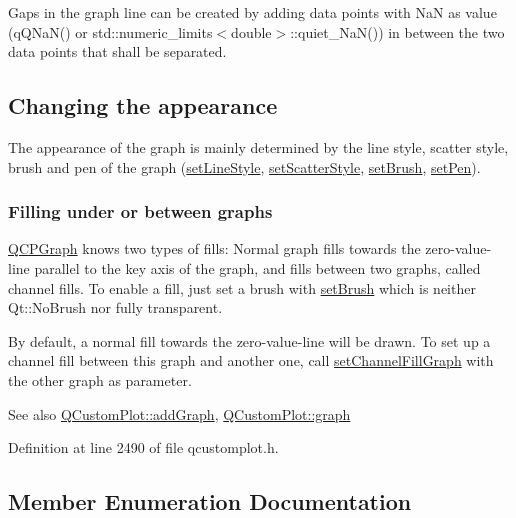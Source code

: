 Gaps in the graph line can be created by adding data points with Na\+N as value ({\ttfamily q\+Q\+Na\+N()} or {\ttfamily std\+::numeric\+\_\+limits$<$double$>$\+::quiet\+\_\+\+Na\+N()}) in between the two data points that shall be separated.\hypertarget{class_q_c_p_statistical_box_appearance}{}\subsection{Changing the appearance}\label{class_q_c_p_statistical_box_appearance}
The appearance of the graph is mainly determined by the line style, scatter style, brush and pen of the graph (\hyperlink{class_q_c_p_graph_a513fecccff5b2a50ce53f665338c60ff}{set\+Line\+Style}, \hyperlink{class_q_c_p_graph_a12bd17a8ba21983163ec5d8f42a9fea5}{set\+Scatter\+Style}, \hyperlink{class_q_c_p_abstract_plottable_a7a4b92144dca6453a1f0f210e27edc74}{set\+Brush}, \hyperlink{class_q_c_p_abstract_plottable_ab74b09ae4c0e7e13142fe4b5bf46cac7}{set\+Pen}).\hypertarget{class_q_c_p_graph_filling}{}\subsubsection{Filling under or between graphs}\label{class_q_c_p_graph_filling}
\hyperlink{class_q_c_p_graph}{Q\+C\+P\+Graph} knows two types of fills\+: Normal graph fills towards the zero-\/value-\/line parallel to the key axis of the graph, and fills between two graphs, called channel fills. To enable a fill, just set a brush with \hyperlink{class_q_c_p_abstract_plottable_a7a4b92144dca6453a1f0f210e27edc74}{set\+Brush} which is neither Qt\+::\+No\+Brush nor fully transparent.

By default, a normal fill towards the zero-\/value-\/line will be drawn. To set up a channel fill between this graph and another one, call \hyperlink{class_q_c_p_graph_a2d03156df1b64037a2e36cfa50351ca3}{set\+Channel\+Fill\+Graph} with the other graph as parameter.

\begin{DoxySeeAlso}{See also}
\hyperlink{class_q_custom_plot_a6fb2873d35a8a8089842d81a70a54167}{Q\+Custom\+Plot\+::add\+Graph}, \hyperlink{class_q_custom_plot_a6d3ed93c2bf46ab7fa670d66be4cddaf}{Q\+Custom\+Plot\+::graph} 
\end{DoxySeeAlso}


Definition at line 2490 of file qcustomplot.\+h.



\subsection{Member Enumeration Documentation}
\hypertarget{class_q_c_p_graph_ad23b514404bd2cb3216f57c90904d6af}{}
